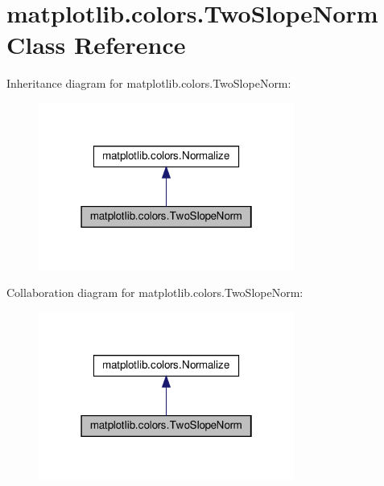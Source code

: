 \hypertarget{classmatplotlib_1_1colors_1_1TwoSlopeNorm}{}\section{matplotlib.\+colors.\+Two\+Slope\+Norm Class Reference}
\label{classmatplotlib_1_1colors_1_1TwoSlopeNorm}


Inheritance diagram for matplotlib.\+colors.\+Two\+Slope\+Norm\+:
\nopagebreak
\begin{figure}[H]
\begin{center}
\leavevmode
\includegraphics[width=238pt]{classmatplotlib_1_1colors_1_1TwoSlopeNorm__inherit__graph}
\end{center}
\end{figure}


Collaboration diagram for matplotlib.\+colors.\+Two\+Slope\+Norm\+:
\nopagebreak
\begin{figure}[H]
\begin{center}
\leavevmode
\includegraphics[width=238pt]{classmatplotlib_1_1colors_1_1TwoSlopeNorm__coll__graph}
\end{center}
\end{figure}
